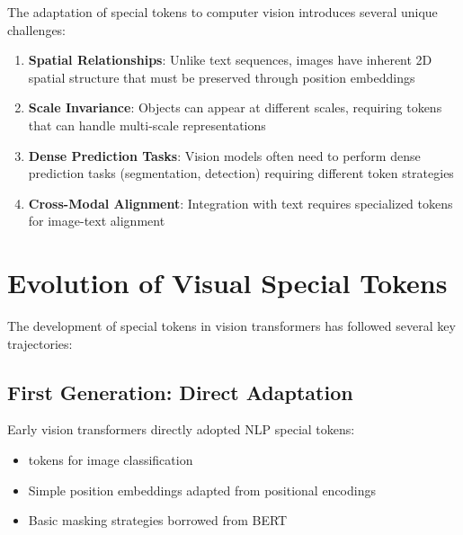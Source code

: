 The adaptation of special tokens to computer vision introduces several unique challenges:

\begin{enumerate}
\item \textbf{Spatial Relationships}: Unlike text sequences, images have inherent 2D spatial structure that must be preserved through position embeddings
\item \textbf{Scale Invariance}: Objects can appear at different scales, requiring tokens that can handle multi-scale representations
\item \textbf{Dense Prediction Tasks}: Vision models often need to perform dense prediction tasks (segmentation, detection) requiring different token strategies
\item \textbf{Cross-Modal Alignment}: Integration with text requires specialized tokens for image-text alignment
\end{enumerate}
\begin{comment}
Feedback: This is a great list of challenges. To make it more concrete for the reader, you could add a brief, specific example for one or two points. For "Spatial Relationships," you could add: "(e.g., ensuring the model knows that the patch representing an 'ear' is located above the patch representing a 'shoulder')." For "Dense Prediction Tasks," you could add: "(e.g., moving beyond a single [CLS] token to produce a representation for every single pixel in an image for segmentation)."
\end{comment}

\section{Evolution of Visual Special Tokens}

The development of special tokens in vision transformers has followed several key trajectories:

\subsection{First Generation: Direct Adaptation}
Early vision transformers directly adopted NLP special tokens:
\begin{itemize}
\item \cls{} tokens for image classification
\item Simple position embeddings adapted from positional encodings
\item Basic masking strategies borrowed from BERT
\end{itemize}

